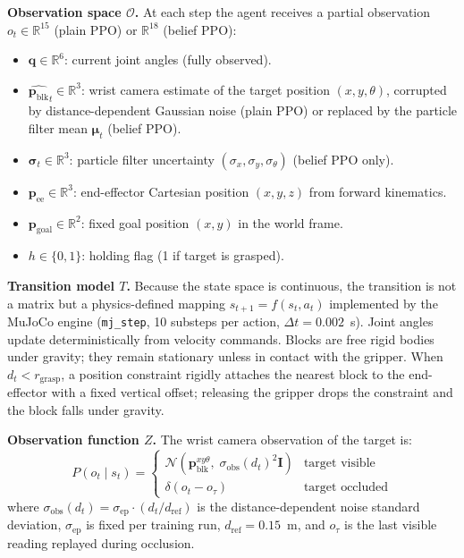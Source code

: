 \documentclass[conference]{IEEEtran}
\newcommand{\Obs}{\mathcal{O}}
\newcommand{\Trans}{T}
\newcommand{\ObsFn}{Z}
\newcommand{\ee}{\mathbf{p}_{\text{ee}}}
\newcommand{\block}{\mathbf{p}_{\text{blk}}}
\newcommand{\goal}{\mathbf{p}_{\text{goal}}}
\newcommand{\sigmaobs}{\sigma_{\text{obs}}}
\newcommand{\sigmaep}{\sigma_{\text{ep}}}
\begin{document}
\textbf{Observation space $\Obs$.}
At each step the agent receives a partial observation
$o_t \in \mathbb{R}^{15}$ (plain PPO) or $\mathbb{R}^{18}$ (belief PPO):
\begin{itemize}
  \item $\mathbf{q} \in \mathbb{R}^6$: current joint angles (fully observed).
  \item $\hat{\block}_t \in \mathbb{R}^3$: wrist camera estimate of the target
        position $(x, y, \theta)$, corrupted by distance-dependent Gaussian
        noise (plain PPO) or replaced by the particle filter mean $\bm{\mu}_t$
        (belief PPO).
  \item $\bm{\sigma}_t \in \mathbb{R}^3$: particle filter uncertainty
        $(\sigma_x, \sigma_y, \sigma_\theta)$ (belief PPO only).
  \item $\ee \in \mathbb{R}^3$: end-effector Cartesian position
        $(x, y, z)$ from forward kinematics.
  \item $\goal \in \mathbb{R}^2$: fixed goal position $(x, y)$ in the
        world frame.
  \item $h \in \{0, 1\}$: holding flag (1 if target is grasped).
\end{itemize}

\textbf{Transition model $\Trans$.}
Because the state space is continuous, the transition is not a matrix but
a physics-defined mapping $s_{t+1} = f(s_t, a_t)$ implemented by the MuJoCo
engine (\texttt{mj\_step}, 10 substeps per action, $\Delta t = 0.002$~s).
Joint angles update deterministically from velocity commands.
Blocks are free rigid bodies under gravity; they remain stationary unless
in contact with the gripper.
When $d_t < r_{\text{grasp}}$, a position constraint rigidly attaches the
nearest block to the end-effector with a fixed vertical offset; releasing the
gripper drops the constraint and the block falls under gravity.

\textbf{Observation function $\ObsFn$.}
The wrist camera observation of the target is:
\begin{equation}
  P(o_t \mid s_t) =
  \begin{cases}
    \mathcal{N}\!\left(\block^{xy\theta},\; \sigmaobs(d_t)^2 \mathbf{I}\right)
      & \text{target visible} \\
    \delta\!\left(o_t - o_{\tau}\right)
      & \text{target occluded}
  \end{cases}
  \label{eq:obs_fn}
\end{equation}
where $\sigmaobs(d_t) = \sigmaep \cdot (d_t / d_{\text{ref}})$ is the
distance-dependent noise standard deviation, $\sigmaep$ is fixed per training
run, $d_{\text{ref}} = 0.15$~m, and $o_{\tau}$ is the last visible reading
replayed during occlusion.
\end{document}
